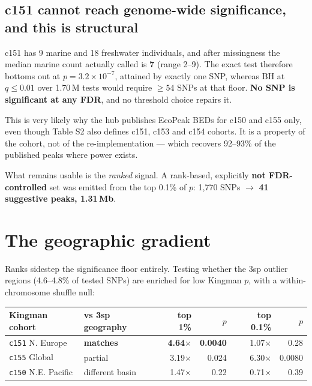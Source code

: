 \documentclass[11pt,a4paper]{article}
\begin{document}
\subsection{c151 cannot reach genome-wide significance, and this is structural}

c151 has 9 marine and 18 freshwater individuals, and after missingness the median marine
count actually called is \textbf{7} (range 2--9). The exact test therefore bottoms out at
$p = 3.2\times10^{-7}$, attained by exactly one SNP, whereas BH at $q\leq0.01$ over
1.70\,M tests would require $\geq54$ SNPs at that floor. \textbf{No SNP is significant at
any FDR}, and no threshold choice repairs it.

This is very likely why the hub publishes EcoPeak BEDs for c150 and c155 only, even though
Table S2 also defines c151, c153 and c154 cohorts. It is a property of the cohort, not of
the re-implementation --- which recovers 92--93\% of the published peaks where power exists.

What remains usable is the \emph{ranked} signal. A rank-based, explicitly
\textbf{not FDR-controlled} set was emitted from the top 0.1\% of $p$: 1{,}770 SNPs
$\rightarrow$ \textbf{41 suggestive peaks, 1.31\,Mb}.

\section{The geographic gradient}\label{sec:geo}

Ranks sidestep the significance floor entirely. Testing whether the 3sp outlier regions
(4.6--4.8\% of tested SNPs) are enriched for low Kingman $p$, with a within-chromosome
shuffle null:

\begin{table}[h]\centering\small
\begin{tabular}{llrrrr}\toprule
Kingman cohort & vs 3sp geography & top 1\% & $p$ & top 0.1\% & $p$ \\ \midrule
\texttt{c151} N. Europe    & \textbf{matches}   & \textbf{4.64$\times$} & \textbf{0.0040} & 1.07$\times$ & 0.28 \\
\texttt{c155} Global       & partial            & 3.19$\times$ & 0.024 & 6.30$\times$ & 0.0080 \\
\texttt{c150} N.E. Pacific & different basin    & 1.47$\times$ & 0.22  & 0.71$\times$ & 0.39 \\ \bottomrule
\end{tabular}
\end{table}
\end{document}

